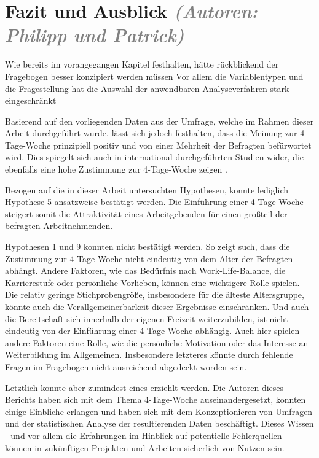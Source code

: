 \chapter{Fazit und Ausblick \textit{\textcolor{gray}{(Autoren: Philipp und Patrick)}}}

Wie bereits im vorangegangen Kapitel festhalten, hätte rückblickend der Fragebogen besser konzipiert werden müssen
Vor allem die Variablentypen und die Fragestellung hat die Auswahl der anwendbaren Analyseverfahren stark eingeschränkt

Basierend auf den vorliegenden Daten aus der Umfrage, welche im Rahmen dieser Arbeit durchgeführt wurde, 
lässt sich jedoch festhalten, dass die Meinung zur 4-Tage-Woche prinzipiell positiv und von einer Mehrheit
der Befragten befürwortet wird. Dies spiegelt sich auch in international durchgeführten Studien wider,
die ebenfalls eine hohe Zustimmung zur 4-Tage-Woche zeigen \parencite[vgl.][]{4_day_week_limited_4_2023}.

Bezogen auf die in dieser Arbeit untersuchten Hypothesen, konnte lediglich Hypothese 5 ansatzweise bestätigt werden.
Die Einführung einer 4-Tage-Woche steigert somit die Attraktivität eines Arbeitgebenden für einen großteil der befragten 
Arbeitnehmenden.

Hypothesen 1 und 9 konnten nicht bestätigt werden. So zeigt such, dass die Zustimmung zur 4-Tage-Woche nicht eindeutig 
von dem Alter der Befragten abhängt. Andere Faktoren, wie das Bedürfnis nach Work-Life-Balance, die Karrierestufe oder 
persönliche Vorlieben, können eine wichtigere Rolle spielen. Die relativ geringe Stichprobengröße, insbesondere für 
die älteste Altersgruppe, könnte auch die Verallgemeinerbarkeit dieser Ergebnisse einschränken.
Und auch die Bereitschaft sich innerhalb der eigenen Freizeit weiterzubilden, ist nicht eindeutig von der Einführung
einer 4-Tage-Woche abhängig. Auch hier spielen andere Faktoren eine Rolle, wie die persönliche Motivation oder das
Interesse an Weiterbildung im Allgemeinen. Insbesondere letzteres könnte durch fehlende Fragen im Fragebogen nicht
ausreichend abgedeckt worden sein.

Letztlich konnte aber zumindest eines erziehlt werden. Die Autoren dieses Berichts haben sich mit dem Thema 4-Tage-Woche
auseinandergesetzt, konnten einige Einbliche erlangen und haben sich mit dem Konzeptionieren von Umfragen und der 
statistischen Analyse der resultierenden Daten beschäftigt. Dieses Wissen - und vor allem die Erfahrungen im Hinblick auf
potentielle Fehlerquellen - können in zukünftigen Projekten und Arbeiten sicherlich von Nutzen sein.